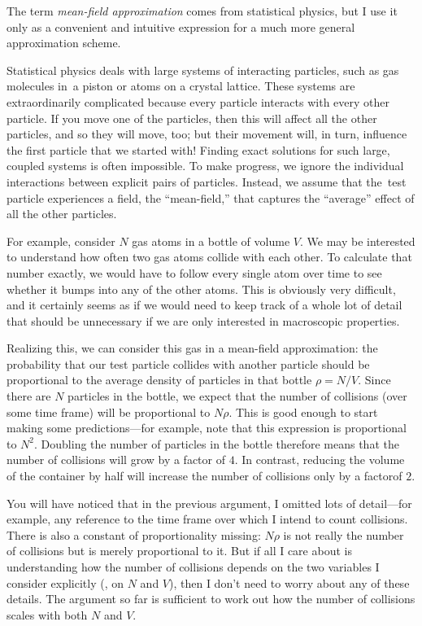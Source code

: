  
The term \emph{mean-field approximation} comes from statistical
physics, but I use it only as a convenient and intuitive expression
for a much more general approximation scheme.

Statistical physics deals with large systems of interacting particles,
such as gas molecules in~a piston or atoms on a crystal lattice.
These systems are extraordinarily complicated because every particle
interacts with every other particle. If you move one of the particles,
then this will affect all the other particles, and so they will move,
too; but their movement will, in turn, influence the first
particle that we started with! Finding exact solutions for such large,
coupled systems is often impossible.  To make progress, we ignore the
individual interactions between explicit pairs of particles. Instead,
we assume that the~test particle experiences a field, the
``mean-field,'' that captures the ``average'' effect of all the other
particles.

For example, consider $N$ gas atoms in a bottle of volume $V$. We may
be interested to understand how often two gas atoms collide with each
other.  To calculate that number exactly, we would have to follow
every single atom over time to see whether it bumps into any of the
other atoms. This is obviously very difficult, and it certainly seems
as if we would need to keep track of a whole lot of detail that should
be unnecessary if we are only interested in macroscopic properties.

Realizing this, we can consider this gas in a mean-field
approximation: the probability that our test particle collides with
another particle should be proportional to the average density of
particles in that bottle $\rho = N/V$. Since there are $N$ particles
in the bottle, we expect that the number of collisions (over some time
frame) will be proportional to $N \rho$. This is good enough to start
making some predictions---for example, note that this expression is
proportional to $N^2$.  Doubling the number of particles in the bottle
therefore means that the number of collisions will grow by a factor of
$4$. In contrast, reducing the volume of the container by half will
increase the number of collisions only by a factor\break of $2$.

You will have noticed that in the previous argument, I omitted
lots of detail---for example, any reference to the time frame over
which I intend to count collisions. There is also a constant of
proportionality missing: $N \rho$ is not really the number of
collisions but is merely proportional to it. But if all I care about
is understanding how the number of collisions depends on the two
variables I consider explicitly (\ie, on $N$ and $V$), then I don't
need to worry about any of these details. The argument so far
is sufficient to work out how the number of collisions
scales with both $N$ and $V$. 

